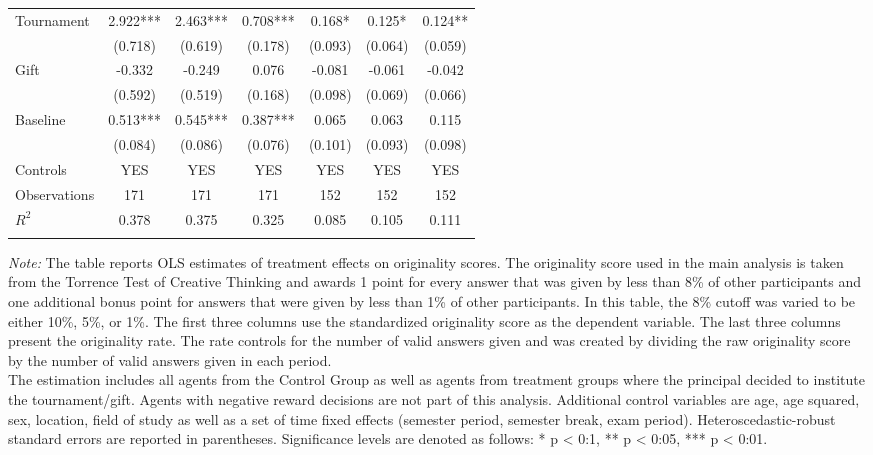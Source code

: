 \begin{landscape}
\begin{table}[h]
\begin{center}
{\begin{tabular}{lcccccc}
Tournament          &       2.922***&       2.463***&       0.708***&       0.168*  &       0.125*  &       0.124** \\
                    &     (0.718)   &     (0.619)   &     (0.178)   &     (0.093)   &     (0.064)   &     (0.059)   \\
Gift                &      -0.332   &      -0.249   &       0.076   &      -0.081   &      -0.061   &      -0.042   \\
                    &     (0.592)   &     (0.519)   &     (0.168)   &     (0.098)   &     (0.069)   &     (0.066)   \\
Baseline            &       0.513***&       0.545***&       0.387***&       0.065   &       0.063   &       0.115   \\
                    &     (0.084)   &     (0.086)   &     (0.076)   &     (0.101)   &     (0.093)   &     (0.098)   \\
\midrule
 Controls & YES & YES & YES & YES & YES & YES \\
\midrule
Observations        &         171   &         171   &         171   &         152   &         152   &         152   \\
$R^2$               &       0.378   &       0.375   &       0.325   &       0.085   &       0.105   &       0.111   \\
\hline\hline\noalign{\medskip}
\end{tabular}}
\begin{minipage}{\textwidth}
\footnotesize {\it Note:} The table reports OLS estimates of treatment effects on originality scores. 
The originality score used in the main analysis is taken from the Torrence Test of Creative Thinking and awards 1 point for every answer that was given by less than 8\% of other participants and one additional bonus point for answers that were given by less than 1\% of other participants. 
In this table, the 8\% cutoff was varied to be either 10\%, 5\%, or 1\%. 
The first three columns use the standardized originality score as the dependent variable. 
The last three columns present the originality rate. 
The rate controls for the number of valid answers given and was created by dividing the raw originality score by the number of valid answers given in each period. \\
The estimation includes all agents from the Control Group as well as agents from treatment groups where the principal decided to institute the tournament/gift. Agents with negative reward decisions are not part of this analysis. 
Additional control variables are age, age squared, sex, location, field of study as well as a set of time fixed effects (semester period, semester break, exam period). 
Heteroscedastic-robust standard errors are reported in parentheses. Significance levels are denoted as follows: * p < 0:1, ** p < 0:05, *** p < 0:01. 
\end{minipage}
\end{center}
\end{table}
\end{landscape}
